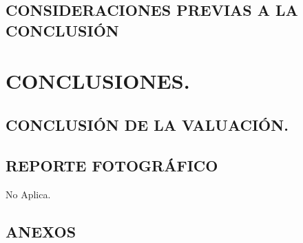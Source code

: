 \documentclass[10pt,letter]{report}
\begin{document}
\section{CONSIDERACIONES PREVIAS A LA CONCLUSI\'ON}\label{sec:o}


\espacio{7cm}
\chapter{CONCLUSIONES.}\label{cap:6}
\thispagestyle{fancy}
\setcounter{section}{16}
\section{CONCLUSI\'ON DE LA VALUACI\'ON.}\label{sec:p}




\section{REPORTE FOTOGR\'AFICO}\label{sec:q}
No Aplica.
\section{ANEXOS}\label{sec:r}




\label{lastpage}
\end{document}
